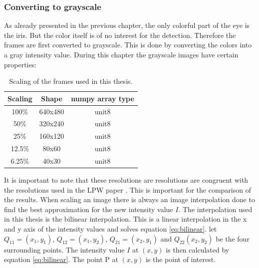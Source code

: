 \subsubsection{Converting to grayscale}
As already presented in the previous chapter, the only colorful part of the eye is the iris. But the color itself is of no interest for the detection. Therefore the frames are first converted to grayscale. This is done by converting the colors into a gray intensity value. During this chapter the grayscale images have certain properties: 

\begin{table}[h]
    \centering 
    \begin{minipage}{0.7\textwidth}
      \centering
      \begin{tabular}{|c|c|c|}
        \hline
        Scaling &  Shape & numpy array type \\
        \hline
        100\% & 640x480& unit8 \\
        50\% & 320x240 & unit8 \\
        25\% & 160x120 & unit8 \\
        12.5\% & 80x60 & unit8 \\
        6.25\% & 40x30 & unit8 \\
        \hline
      \end{tabular}
      \caption{Scaling of the frames used in this thesis.}
      \label{tab:resoluiton}
    \end{minipage}\hfill
\end{table}

It is important to note that these resolutions are resolutions are congruent with the resolutions used in the LPW paper \cite{LPW}. This is important for the comparison of the results.
When scaling an image there is always an image interpolation done to find the best approximation for the new intensity value $I$. The interpolation used in this thesis is the bilinear interpolation.\cite{bilinearinter} This is a linear interpolation in the x and y axis of the intensity values and solves equation \ref{eq:bilinear}. let $Q_{11}=(x_1,y_1)$, $Q_{12}=(x_1,y_2)$, $Q_{21}=(x_2,y_1)$ and $Q_{22}(x_2,y_2)$ be the four surrounding points. The intensity value $I$ at $(x,y)$ is then calculated by equation \ref{eq:bilinear}. The point P at $(x,y)$ is the point of interest. 

